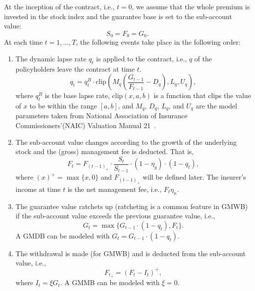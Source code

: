 At the inception of the contract, i.e., $t=0$, we assume that the whole premium is invested in the stock index and the guarantee base is set to the sub-account value:
\begin{equation*}
    S_0=F_0=G_0.
\end{equation*}
At each time $t=1,\ldots,T$, the following events take place in the following order:
\begin{enumerate}
    \item The dynamic lapse rate $q_t$ is applied to the contract, i.e., $q$ of the policyholders leave the contract at time $t$.
        \begin{equation*}
            q_t = q_t^B \cdot \text{clip} (M_q (\frac{G_{t-1}}{F_{t-1}} - D_q), L_q, U_q),
        \end{equation*}
    where $q_t^B$ is the base lapse rate, $\text{clip}(x, a, b)$ is a function that clips the value of $x$ to be within the range $[a, b]$, and $M_q$, $D_q$, $L_q$, and $U_q$ are the model parameters taken from National Association of Insurance Commissioners’(NAIC) Valuation Manual 21~\citep{naic2021}.
    \item The sub-account value changes according to the growth of the underlying stock and the (gross) management fee is deducted. That is, 
        \begin{equation*}
            F_t = F_{(t-1)_+}\cdot\frac{S_{t}}{S_{t-1}}\cdot(1-\eta_g)\cdot(1-q_t),
        \end{equation*} 
    where $(x)^+=\max\{x,0\}$ and $F_{(t-1)_+}$ will be defined later. The insurer's income at time $t$ is the net management fee, i.e., $F_t\eta_n$. 

    \item The guarantee value ratchets up (ratcheting is a common feature in GMWB) if the sub-account value exceeds the previous guarantee value, i.e., 
        \begin{equation*}
            G_t = \max\{G_{t-1}\cdot(1-q_t),F_t\}.
        \end{equation*} 
    A GMDB can be modeled with $G_t = G_{t-1}\cdot(1-q_t)$.

    \item The withdrawal is made (for GMWB) and is deducted from the sub-account value, i.e., 
        \begin{equation*}
            F_{t_+} = (F_t - I_t)^+,
        \end{equation*} 
    where $I_t = \xi G_t$. A GMMB can be modeled with $\xi = 0$.
\end{enumerate}

